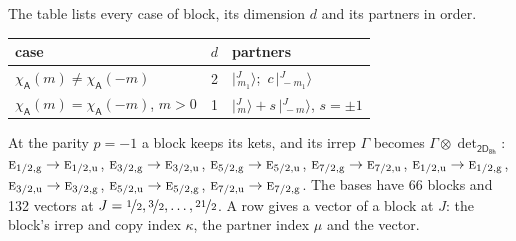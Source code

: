 \documentclass[10pt,a4paper]{article}
\numberwithin{equation}{section}
\newcommand{\grp}[1]{\mathsf{#1}}
\newcommand{\irr}[1]{\text{\normalfont\scshape #1}}
\newcommand{\ptag}[1]{\mathrm{#1}}
\newcommand{\chiA}{\chi_{\grp{A}}}
\newcommand{\irrprod}{\otimes}
\newcommand{\mult}{\kappa}
\newcommand{\intx}{\mu}
\newcommand{\jm}[2]{\bigl\lvert{}^{#1}_{\,#2}\bigr\rangle}
\begin{document}
\leavevmode\label{n:head.case}\label{n:head.partners}The table lists every case of block, its dimension $d$ and its partners in order.
\begin{center}\begin{tabular}{@{}lrl@{}}\toprule
case & $d$ & partners\\\midrule
$\chiA(m) \ne \chiA(-m)$ & 2 & $\jm{J}{m_1}$;\ $c\,\jm{J}{-m_1}$\\
$\chiA(m) = \chiA(-m)$, $m > 0$ & 1 & $\jm{J}{m} + s\,\jm{J}{-m}$, $s = \pm1$\\
\bottomrule\end{tabular}\end{center}
At the parity $p = -1$ a block keeps its kets, and its irrep $\Gamma$ becomes $\Gamma \irrprod \det_{\grp{2D_{8h}}}$: $\irr{e}_{1/2,\ptag{g}} \to \irr{e}_{1/2,\ptag{u}}$, $\irr{e}_{3/2,\ptag{g}} \to \irr{e}_{3/2,\ptag{u}}$, $\irr{e}_{5/2,\ptag{g}} \to \irr{e}_{5/2,\ptag{u}}$, $\irr{e}_{7/2,\ptag{g}} \to \irr{e}_{7/2,\ptag{u}}$, $\irr{e}_{1/2,\ptag{u}} \to \irr{e}_{1/2,\ptag{g}}$, $\irr{e}_{3/2,\ptag{u}} \to \irr{e}_{3/2,\ptag{g}}$, $\irr{e}_{5/2,\ptag{u}} \to \irr{e}_{5/2,\ptag{g}}$, $\irr{e}_{7/2,\ptag{u}} \to \irr{e}_{7/2,\ptag{g}}$.
The bases have 66 blocks and 132 vectors at $J = \nicefrac{1}{2}, \nicefrac{3}{2}, \dots, \nicefrac{21}{2}$. \label{n:head.vector}A row gives a vector of a block at $J$: the block's irrep and copy index $\mult$, the partner index $\intx$ and the vector.
\end{document}
